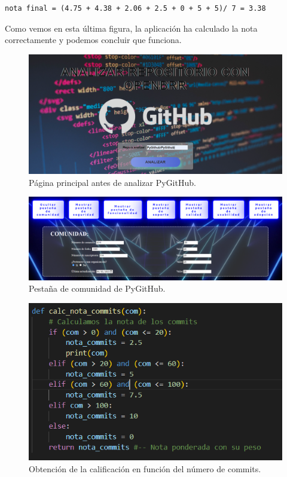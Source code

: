 \documentclass[a4paper, 12pt]{book}
\begin{document}
\begin{verbatim}
nota final = (4.75 + 4.38 + 2.06 + 2.5 + 0 + 5 + 5)/ 7 = 3.38
\end{verbatim}

Como vemos en esta última figura, la aplicación ha calculado la nota correctamente y podemos concluir que funciona.

\begin{figure}
    \centering
    \includegraphics[width=1\textwidth, keepaspectratio]{img/principal_main.png}
    \caption{Página principal antes de analizar PyGitHub.}\label{fig:pricipal_pygithub}
\end{figure}

\begin{figure}
    \centering
    \includegraphics[width=1\textwidth, keepaspectratio]{img/pygithub_comunidad.png}
    \caption{Pestaña de comunidad de PyGitHub.}\label{fig:comunidad_pygithub}
\end{figure}

\begin{figure}
    \centering
    \includegraphics[width=1\textwidth, keepaspectratio]{img/nota_commits.png}
    \caption{Obtención de la calificación en función del número de commits.}\label{fig:nota_commits}
\end{figure}
\end{document}
